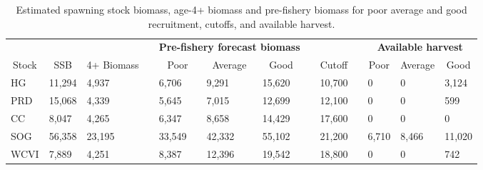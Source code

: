 %
\begin{table}[!tbp]
 \small
 \caption{Estimated spawning stock biomass,  age-4+ biomass and pre-fishery
			biomass for poor average and good recruitment,  cutoffs,  and 
			available harvest.\label{TableCatchAdvice}} 
 \begin{center}
 \begin{tabular}{lllclllclclll}\hline\hline
\multicolumn{3}{c}{\bfseries }&
\multicolumn{1}{c}{\bfseries }&
\multicolumn{3}{c}{\bfseries Pre-fishery forecast biomass}&
\multicolumn{1}{c}{\bfseries }&
\multicolumn{1}{c}{\bfseries }&
\multicolumn{1}{c}{\bfseries }&
\multicolumn{3}{c}{\bfseries Available harvest}
\tabularnewline \cline{1-13}
\multicolumn{1}{c}{Stock}&\multicolumn{1}{c}{SSB}&\multicolumn{1}{c}{4+ Biomass}&\multicolumn{1}{c}{}&\multicolumn{1}{c}{Poor}&\multicolumn{1}{c}{Average}&\multicolumn{1}{c}{Good}&\multicolumn{1}{c}{}&\multicolumn{1}{c}{Cutoff}&\multicolumn{1}{c}{}&\multicolumn{1}{c}{Poor}&\multicolumn{1}{c}{Average}&\multicolumn{1}{c}{Good}\tabularnewline
\hline
HG&11,294& 4,937&& 6,706& 9,291&15,620&&10,700&&     0&     0& 3,124\tabularnewline
PRD&15,068& 4,339&& 5,645& 7,015&12,699&&12,100&&     0&     0&   599\tabularnewline
CC& 8,047& 4,265&& 6,347& 8,658&14,429&&17,600&&     0&     0&     0\tabularnewline
SOG&56,358&23,195&&33,549&42,332&55,102&&21,200&& 6,710& 8,466&11,020\tabularnewline
WCVI& 7,889& 4,251&& 8,387&12,396&19,542&&18,800&&     0&     0&   742\tabularnewline
\hline
\end{tabular}

\end{center}

\end{table}

